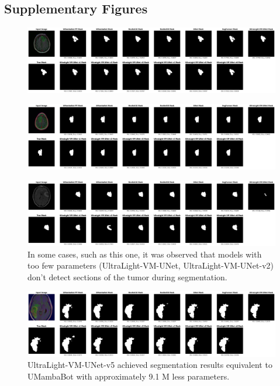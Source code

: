 \documentclass[conference]{IEEEtran}
\begin{document}
\subsection{Supplementary Figures} \label{supp_figs}

\begin{figure}[!h]
    \centering
    \includegraphics[width=\textwidth]{imgs/14_9.png}
\end{figure}

\begin{figure}[!h]
    \centering
    \includegraphics[width=\textwidth]{imgs/22_4.png}
\end{figure}

\begin{figure}[!h]
    \centering
    \includegraphics[width=\textwidth]{imgs/13_4.png}
    \caption{In some cases, such as this one, it was observed that models with too few parameters (UltraLight-VM-UNet, UltraLight-VM-UNet-v2) don't detect sections of the tumor during segmentation.}
\end{figure}

\begin{figure}[!h]
    \centering
    \includegraphics[width=\textwidth]{imgs/19_4.png}
    \caption{UltraLight-VM-UNet-v5 achieved segmentation results equivalent to UMambaBot with approximately 9.1 M less parameters.}
\end{figure}
\end{document}
